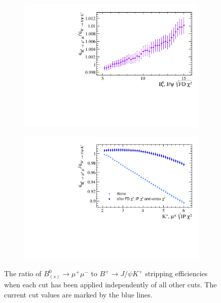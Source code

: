 \begin{figure}
    \begin{subfigure}[b]{0.4\textwidth}
        \includegraphics[width=\textwidth]{./Figs/Selection/BsMuMu_JpsiK_FD.pdf}
        \caption{ }
        \label{fig:FD_ratio}
    \end{subfigure}
   \begin{subfigure}[b]{0.4\textwidth}
        \includegraphics[width=\textwidth]{./Figs/Selection/Bs2MuMu_JpsiK_daughter_IP.pdf}
        \caption{ }
        \label{fig:IPS_ratio}
    \end{subfigure}
    \caption{The ratio of $B^{0}_{(s)}\to\mu^{+} \mu^{-}$ to $B^{+}\to J/\psi K^{+}$ stripping efficiencies when each cut has been applied independently of all other cuts. The current cut values are marked by the blue lines.}
    \label{fig:ratioplotsJpsik}
\end{figure}


